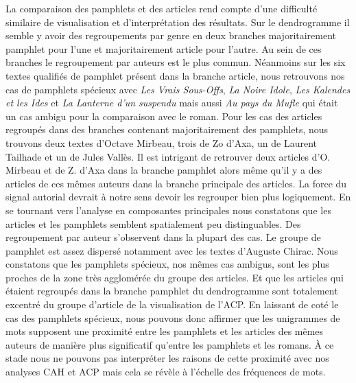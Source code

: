 La comparaison des pamphlets et des articles rend compte d'une difficulté similaire de visualisation et d'interprétation des résultats. Sur le dendrogramme il semble y avoir des regroupements par genre en deux branches majoritairement pamphlet pour l'une et majoritairement article pour l'autre. Au sein de ces branches le regroupement par auteurs est le plus commun. Néanmoins sur les six textes qualifiés de pamphlet présent dans la branche article, nous retrouvons nos cas de pamphlets spécieux avec \textit{Les Vrais Sous-Offs}, \textit{La Noire Idole}, \textit{Les Kalendes et les Ides} et \textit{La Lanterne d'un suspendu} mais aussi \textit{Au pays du Mufle} qui était un cas ambigu pour la comparaison avec le roman.
Pour les cas des articles regroupés dans des branches contenant majoritairement des pamphlets, nous trouvons deux textes d'Octave Mirbeau, trois de Zo d'Axa, un de Laurent Tailhade et un de Jules Vallès. Il est intrigant de retrouver deux articles d'O. Mirbeau et de Z. d'Axa dans la branche pamphlet alors même qu'il y a des articles de ces mêmes auteurs dans la branche principale des articles. La force du signal autorial devrait à notre sens devoir les regrouper bien plus logiquement. En se tournant vers l'analyse en composantes principales nous constatons que les articles et les pamphlets semblent spatialement peu distinguables. Des regroupement par auteur s'observent dans la plupart des cas. Le groupe de pamphlet est assez dispersé notamment avec les textes d'Auguste Chirac. Nous constatons que les pamphlets spécieux, nos mêmes cas ambigus, sont les plus proches de la zone très agglomérée du groupe des articles. Et que les articles qui étaient regroupés dans la branche pamphlet du dendrogramme sont totalement excentré du groupe d'article de la visualisation de l'ACP. En laissant de coté le cas des pamphlets spécieux, nous pouvons donc affirmer que les unigrammes de mots supposent une proximité entre les pamphlets et les articles des mêmes auteurs de manière plus significatif qu'entre les pamphlets et les romans. À  ce stade nous ne pouvons pas interpréter les raisons de cette proximité avec nos analyses CAH et ACP mais cela se révèle à l'échelle des fréquences de mots.


